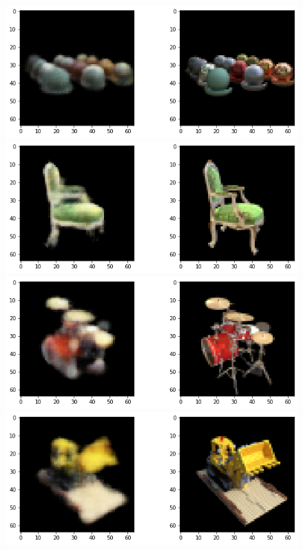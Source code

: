 \documentclass[10pt,twocolumn,letterpaper]{article}
\begin{document}
\begin{CJK}{UTF8}{bkai}
   \begin{figure}
      \begin{center}
         \includegraphics[width=1\linewidth]{img/experiment/train_0.png}
         \includegraphics[width=1\linewidth]{img/experiment/train_1.png}
         \includegraphics[width=1\linewidth]{img/experiment/train_2.png}
         \includegraphics[width=1\linewidth]{img/experiment/train_3.png}

\end{center}
\end{figure}
\end{CJK}
\end{document}
